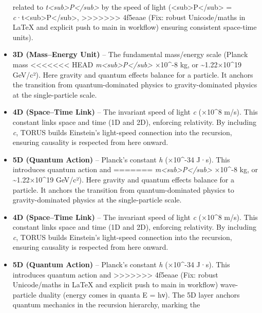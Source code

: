 \documentclass[]{article}
\begin{document}
\begin{itemize}
  related to
  \emph{t\textless{}sub\textgreater{}P\textless{}/sub\textgreater{}} by
  the speed of light
  (\ell\textless{}sub\textgreater{}P\textless{}/sub\textgreater{} =
  \emph{c}·t\textless{}sub\textgreater{}P\textless{}/sub\textgreater{},
>>>>>>> 4f5eaae (Fix: robust Unicode/maths in LaTeX and explicit push to main in workflow)
  ensuring consistent space-time units).
\item
  \textbf{3D (Mass--Energy Unit)} -- The fundamental mass/energy scale
  (Planck mass
<<<<<<< HEAD
  \emph{m\textless sub\textgreater P\textless/sub\textgreater{}} ×10\^{}-8 kg, or \textasciitilde1.22×10\^{}19
  GeV/c²)\hspace{0pt}. Here gravity and quantum effects balance for a
  particle. It anchors the transition from quantum-dominated physics to
  gravity-dominated physics at the single-particle scale.
\item
  \textbf{4D (Space--Time Link)} -- The invariant speed of light
  \emph{c} (×10\^{}8 m/s)\hspace{0pt}. This constant links space
  and time (1D and 2D), enforcing relativity. By including \emph{c},
  TORUS builds Einstein's light-speed connection into the recursion,
  ensuring causality is respected from here onward.
\item
  \textbf{5D (Quantum Action)} -- Planck's constant \emph{h} (×10\^{}-34 J·s)\hspace{0pt}. This introduces quantum action and
=======
  \emph{m\textless{}sub\textgreater{}P\textless{}/sub\textgreater{}} ×10\^{}-8 kg, or \textasciitilde{}1.22×10\^{}19 GeV/c²)​. Here
  gravity and quantum effects balance for a particle. It anchors the
  transition from quantum-dominated physics to gravity-dominated physics
  at the single-particle scale.
\item
  \textbf{4D (Space--Time Link)} -- The invariant speed of light
  \emph{c} (×10\^{}8 m/s)​. This constant links space and time (1D
  and 2D), enforcing relativity. By including \emph{c}, TORUS builds
  Einstein's light-speed connection into the recursion, ensuring
  causality is respected from here onward.
\item
  \textbf{5D (Quantum Action)} -- Planck's constant \emph{h} (×10\^{}-34 J·s)​. This introduces quantum action and
>>>>>>> 4f5eaae (Fix: robust Unicode/maths in LaTeX and explicit push to main in workflow)
  wave-particle duality (energy comes in quanta E = hν). The 5D layer
  anchors quantum mechanics in the recursion hierarchy, marking the

\end{itemize}
\end{document}
